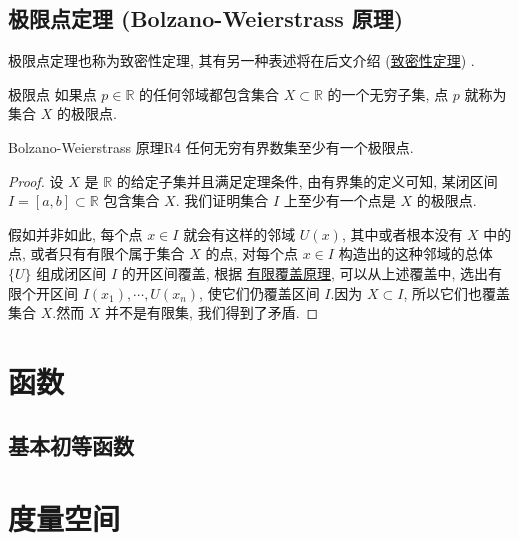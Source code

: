 \documentclass[cn,toc=twocol]{elegantbook}
\newcommand{\R}{\mathbb{R}}
\begin{document}
\subsection{极限点定理 (Bolzano-Weierstrass 原理)}
极限点定理也称为致密性定理, 其有另一种表述将在后文介绍 (\hyperref[thm:R4']{致密性定理}) .

\begin{definition}{极限点}
如果点 $p\in\R$ 的任何邻域都包含集合 $X\subset\R$ 的一个无穷子集, 点 $p$ 就称为集合 $X$ 的极限点.
\end{definition}

\begin{theorem}{Bolzano-Weierstrass 原理}{R4}
任何无穷有界数集至少有一个极限点.
\end{theorem}
\begin{proof}
设 $X$ 是 $\R$ 的给定子集并且满足定理条件, 由有界集的定义可知, 某闭区间 $I = [a, b] \subset\R$ 包含集合 $X$. 我们证明集合 $I$ 上至少有一个点是 $X$ 的极限点.

假如并非如此, 每个点 $x \in I$ 就会有这样的邻域 $U(x)$, 其中或者根本没有 $X$ 中的点, 或者只有有限个属于集合 $X$ 的点, 对每个点 $x\in I$ 构造出的这种邻域的总体 $\{U\}$ 组成闭区间 $I$ 的开区间覆盖, 根据 \hyperref[thm:R3]{有限覆盖原理}, 可以从上述覆盖中, 选出有限个开区间 $I(x_1), \cdots, U(x_n)$, 使它们仍覆盖区间 $I$.因为 $X \subset I$, 所以它们也覆盖集合 $X$.然而 $X$ 并不是有限集, 我们得到了矛盾.
\end{proof}
\smallskip

\section{函数}

\subsection{基本初等函数}





\section{度量空间}
\end{document}
